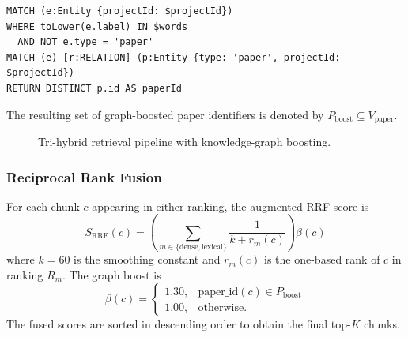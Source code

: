 \documentclass[conference]{IEEEtran}
\begin{document}
\begin{lstlisting}[language={},caption={Representative Neo4j Cypher traversal.},label={lst:cypher}]
MATCH (e:Entity {projectId: $projectId})
WHERE toLower(e.label) IN $words
  AND NOT e.type = 'paper'
MATCH (e)-[r:RELATION]-(p:Entity {type: 'paper', projectId: $projectId})
RETURN DISTINCT p.id AS paperId
\end{lstlisting}

The resulting set of graph-boosted paper identifiers is denoted by $P_{\mathrm{boost}} \subseteq V_{\mathrm{paper}}$.

\begin{figure}[!t]
\centering
{}
\caption{Tri-hybrid retrieval pipeline with knowledge-graph boosting.}
\label{fig:retrieval}
\end{figure}

\subsubsection{Reciprocal Rank Fusion}
For each chunk $c$ appearing in either ranking, the augmented RRF score is
\begin{equation}
S_{\mathrm{RRF}}(c) = \left( \sum_{m \in \{\mathrm{dense}, \mathrm{lexical}\}} \frac{1}{k + r_m(c)} \right) \beta(c)
\label{eq:rrf}
\end{equation}
where $k = 60$ is the smoothing constant and $r_m(c)$ is the one-based rank of $c$ in ranking $R_m$. The graph boost is
\begin{equation}
\beta(c) = \begin{cases}
1.30, & \mathrm{paper\_id}(c) \in P_{\mathrm{boost}} \\
1.00, & \text{otherwise}.
\end{cases}
\label{eq:boost}
\end{equation}
The fused scores are sorted in descending order to obtain the final top-$K$ chunks.
\end{document}
